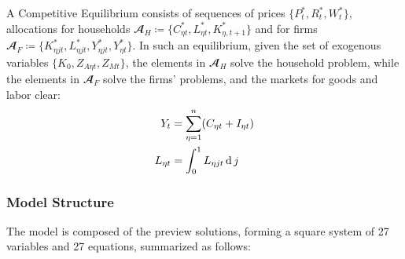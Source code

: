 \documentclass[
	thesis.tex
	]{subfiles}
\begin{document}
A Competitive Equilibrium consists of sequences of prices $\{P_t^\ast, R_t^\ast, W_t^\ast\}$, allocations for households $\mathbfscr{A}_H \coloneq \{C_{\eta t}^\ast, L_{\eta t}^\ast, K_{\eta, t+1}^\ast\}$ and for firms $\mathbfscr{A}_F \coloneq \{K_{\eta jt}^\ast, L_{\eta jt}^\ast, Y_{\eta jt}^\ast, Y_{\eta t}^\ast\}$. In such an equilibrium, given the set of exogenous variables $\{K_0, Z_{A\eta t}, Z_{Mt}\}$, the elements in $\mathbfscr{A}_H$ solve the household problem, while the elements in $\mathbfscr{A}_F$ solve the firms' problems, and the markets for goods and labor clear:
\begin{align}
	Y_t &= \sum_{\eta=1}^{n} (C_{\eta t} + I_{\eta t}) \label{eq:reg-market-clearing-condition} \\
	L_{\eta t} &= \int_{0}^{1} L_{\eta jt} \operatorname{d} j \label{eq:reg-market-clearing-condition-2}
\end{align}

\newpage


\subsubsection{Model Structure}

The model is composed of the preview solutions, forming a square system of 27 variables and 27 equations, summarized as follows:
\end{document}
